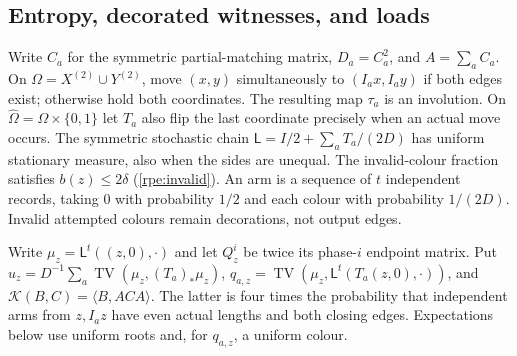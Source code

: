 \subsection{Entropy, decorated witnesses, and loads}
\label{ent:entropy-subsection}
Write $C_a$ for the symmetric partial-matching matrix, $D_a=C_a^2$, and $A=\sum_aC_a$. On $\Omega=X^{(2)}\cup{}Y^{(2)}$, move $(x,y)$ simultaneously to $(I_ax,I_ay)$ if both edges exist; otherwise hold both coordinates. The resulting map $\tau_a$ is an involution. On $\widehat\Omega=\Omega\times\{0,1\}$ let $T_a$ also flip the last coordinate precisely when an actual move occurs.
The symmetric stochastic chain $\mathsf{L}=I/2+\sum_aT_a/(2D)$ has uniform stationary measure, also when the sides are unequal.
The invalid-colour fraction satisfies \label{rpe:invalid}$b(z)\le2\delta$ \textup{(\ref{rpe:invalid})}. An arm is a sequence of $t$ independent records, taking $0$ with probability $1/2$ and each colour with probability $1/(2D)$. Invalid attempted colours remain decorations, not output edges.

Write $\mu_z=\mathsf{L}^t((z,0),\cdot)$ and let $Q_z^i$ be twice its phase-$i$ endpoint matrix. Put $u_z=D^{-1}\sum_a\operatorname{TV}(\mu_z,(T_a)_*\mu_z)$, $q_{a,z}=\operatorname{TV}(\mu_z,\mathsf{L}^t(T_a(z,0),\cdot))$, and $\mathcal{K}(B,C)=\langle{}B,ACA\rangle$. The latter is four times the probability that independent arms from $z,I_az$ have even actual lengths and both closing edges. Expectations below use uniform roots and, for $q_{a,z}$, a uniform colour.

